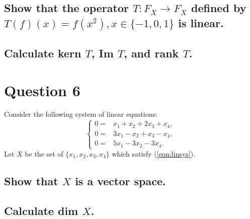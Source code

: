 \documentclass[11pt]{article} %
\begin{document}
\subsection{Show that the operator $T: F_X \rightarrow F_X$ defined by $T(f)(x) = f(x^2), x \in \{ -1,0,1\}$ is linear.}
\subsection{Calculate kern $T$, Im $T$, and rank $T$.}
\section{Question 6}
Consider the following system of linear equations:
\begin{equation}
\begin{cases}
0=& x_1 + x_2 + 2x_3 + x_4, \\
0=&3x_1 - x_2 + x_3 - x_4, \\
0=&5x_1 - 3x_2 - 3x_4. \label{eqn:linsys}
\end{cases}
\end{equation}
Let $X$ be the set of $\{ x_1,x_2,x_3,x_4 \}$ which satisfy (\ref{eqn:linsys}).
\subsection{Show that $X$ is a vector space.}
\subsection{Calculate dim $X$.}
\end{document}
